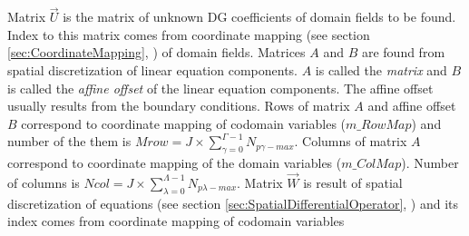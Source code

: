 \documentclass[BoSSSForSolvingConservationLaws.tex]{subfiles}
\begin{document}
Matrix $\vec{U}$ is the matrix of unknown DG coefficients of domain fields to be found. Index to this matrix comes from coordinate mapping (see section \ref{sec:CoordinateMapping}, ) of domain fields. Matrices $A$ and $B$ are found from spatial discretization of linear equation components. $A$ is called the \emph{matrix} and $B$ is called the \emph{affine offset} of the linear equation components. The affine offset usually results from the boundary conditions. Rows of matrix $A$ and affine offset $B$ correspond to coordinate mapping of codomain variables ($m\_RowMap$) and number of the them is $Mrow=J\times \sum_{\gamma=0}^{\Gamma-1} N_{p\gamma-max}$. Columns of matrix $A$ correspond to coordinate mapping of the domain variables ($m\_ColMap$). Number of columns is $Ncol=J\times\sum_{\lambda=0}^{\Lambda-1} N_{p\lambda-max}$. Matrix $\vec{W}$ is result of spatial discretization of equations (see section \ref{sec:SpatialDifferentialOperator}, ) and its index comes from coordinate mapping of codomain variables
\end{document}
